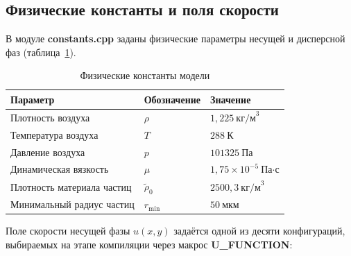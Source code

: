 \documentclass[14pt,a4paper]{extarticle}
\numberwithin{figure}{section}
\numberwithin{table}{section}
\begin{document}
\subsection{Физические константы и поля скорости}

В модуле \textbf{constants.cpp} заданы физические параметры несущей и дисперсной фаз
(таблица~\ref{tab:constants}).

\begin{table}[h]
\centering
\caption{Физические константы модели}
\label{tab:constants}
\begin{tabular}{|l|l|l|}
\hline
\textbf{Параметр} & \textbf{Обозначение} & \textbf{Значение} \\
\hline
Плотность воздуха          & $\rho$               & $1{,}225\ \text{кг/м}^3$ \\
Температура воздуха        & $T$                  & $288\ \text{К}$ \\
Давление воздуха           & $p$                  & $101325\ \text{Па}$ \\
Динамическая вязкость      & $\mu$                & $1{,}75 \times 10^{-5}\ \text{Па·с}$ \\
Плотность материала частиц & $\tilde{\rho}_0$     & $2500{,}3\ \text{кг/м}^3$ \\
Минимальный радиус частиц  & $r_{\min}$           & $50\ \text{мкм}$ \\
\hline
\end{tabular}
\end{table}

Поле скорости несущей фазы $u(x, y)$ задаётся одной из десяти конфигураций,
выбираемых на этапе компиляции через макрос \textbf{U\_FUNCTION}:
\end{document}
